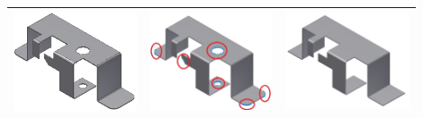 \begin{minipage}[t]{\linewidth}
\begin{tabular}[h]{@{} p{0.3\linewidth} p{0.3\linewidth}  p{0.3\linewidth}@{}}
\includegraphics[width=0.98\linewidth]{..//Common/images/DefeatPhase_I_3} &
\includegraphics[width=0.98\linewidth]{..//Common/images/DefeatPhase_II_2} &
\includegraphics[width=0.98\linewidth]{..//Common/images/DefeatPhase_II_3} \\ \bottomrule


\end{tabular}
\end{minipage}
